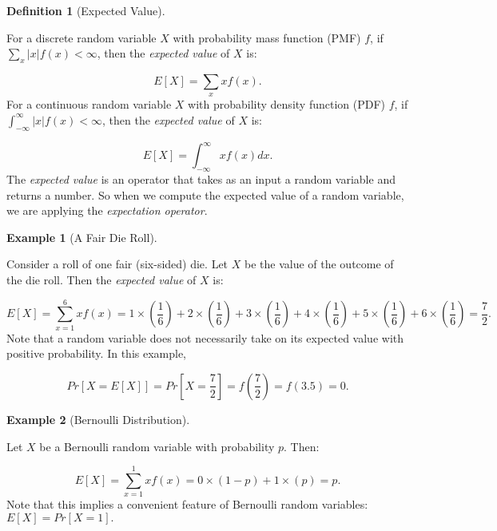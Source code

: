 \documentclass[
]{article}
\theoremstyle{definition}
\newtheorem{definition}{Definition}[section]
\theoremstyle{definition}
\newtheorem{example}{Example}[section]
\theoremstyle{definition}
\theoremstyle{remark}
\begin{document}
\begin{definition}[Expected Value]
\protect\hypertarget{def:unlabeled-div-54}{}\label{def:unlabeled-div-54}

For a discrete random variable \(X\) with probability mass function (PMF) \(f\), if \(\sum_x \left| x \right| f(x) < \infty\), then the \emph{expected value} of \(X\) is:

\[E[X] = \sum_x xf(x).\]
For a continuous random variable \(X\) with probability density function (PDF) \(f\), if \(\int_{-\infty}^{\infty}\left| x \right| f(x) < \infty\), then the \emph{expected value} of \(X\) is:

\[E[X] = \int_{-\infty}^{\infty}xf(x)dx.\]
The \emph{expected value} is an operator that takes as an input a random variable and returns a number. So when we compute the expected value of a random variable, we are applying the \emph{expectation operator}.

\end{definition}

\begin{example}[A Fair Die Roll]
\protect\hypertarget{exm:unlabeled-div-55}{}\label{exm:unlabeled-div-55}

Consider a roll of one fair (six-sided) die. Let \(X\) be the value of the outcome of the die roll. Then the \emph{expected value} of \(X\) is:

\[
E[X] = \sum_{x=1}^6 xf(x) = 1 \times (\frac{1}{6}) + 2 \times (\frac{1}{6}) + 3 \times (\frac{1}{6}) + 4 \times (\frac{1}{6}) + 5 \times (\frac{1}{6}) + 6 \times (\frac{1}{6}) = \frac{7}{2}.
\]
Note that a random variable does not necessarily take on its expected value with positive probability. In this example,

\[Pr[X = E[X]] = Pr[X = \frac{7}{2}] = f(\frac{7}{2}) = f(3.5) = 0.\]

\end{example}

\begin{example}[Bernoulli Distribution]
\protect\hypertarget{exm:unlabeled-div-56}{}\label{exm:unlabeled-div-56}

Let \(X\) be a Bernoulli random variable with probability \(p\). Then:

\[
E[X] = \sum_{x=1}^1 xf(x) = 0 \times (1 - p) + 1 \times (p) = p.
\]
Note that this implies a convenient feature of Bernoulli random variables: \(E[X] = Pr[X = 1].\)

\end{example}
\end{document}
